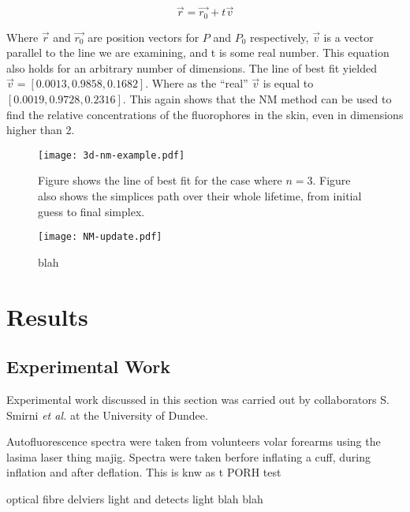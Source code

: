 \begin{equation}
\overrightarrow{r}=\overrightarrow{r_0}+t\overrightarrow{v}
\label{eqn:3dlineeqn}
\end{equation}

Where $\overrightarrow{r}$ and $\overrightarrow{r_0}$ are position vectors for $P$ and $P_0$ respectively, $\overrightarrow{v}$ is a vector parallel to the line we are examining, and t is some real number.
This equation also holds for an arbitrary number of dimensions.
The line of best fit yielded $\overrightarrow{v} =\left[0.0013, 0.9858, 0.1682\right]$.
Where as the ``real'' $\overrightarrow{v}$ is equal to $\left[0.0019, 0.9728, 0.2316\right]$.
This again shows that the NM method can be used to find the relative concentrations of the fluorophores in the skin, even in dimensions higher than 2.

\begin{figure}[!htpb]
  \centering
  \texttt{[image: 3d-nm-example.pdf]}
  \caption{Figure shows the line of best fit for the case where $n=3$. Figure also shows the simplices path over their whole lifetime, from initial guess to final simplex.}
  \label{fig:3dtoymodel}
\end{figure}


\begin{figure}[!htpb]
  \centering
  \texttt{[image: NM-update.pdf]}
  \caption{blah}
  \label{fig:NMupdate}
\end{figure}




\FloatBarrier
\section{Results}

\subsection{Experimental Work}

Experimental work discussed in this section was carried out by collaborators S. Smirni \textit{et al.} at the University of Dundee.

Autofluorescence spectra were taken from volunteers volar forearms using the lasima laser thing majig.
Spectra were taken berfore inflating a cuff, during inflation and after deflation. 
This is knw as t PORH test

optical fibre delviers  light and detects light blah blah


